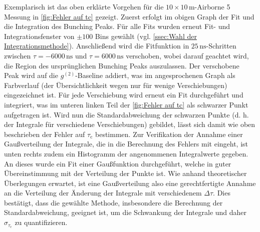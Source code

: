 Exemplarisch ist das oben erklärte Vorgehen für die $10\times 10\,\mathrm{m}$-Airborne 5 Messung in \autoref{fig:Fehler auf tc} gezeigt. 
Zuerst erfolgt im obigen Graph der Fit und die Integration des Bunching Peaks. 
Für alle Fits wurden erneut Fit- und Integrationsfenster von $\pm 100$ Bins gewählt (vgl. \autoref{ssec:Wahl der Integrationsmethode}). 
Anschließend wird die Fitfunktion in $25\,\mathrm{ns}$-Schritten zwischen $\tau = -6000\,\mathrm{ns}$ und $\tau = 6000\,\mathrm{ns}$ verschoben, wobei darauf geachtet wird, die Region des ursprünglichen Bunching Peaks auszulassen. 
Der verschobene Peak wird auf die $g^{(2)}$-Baseline addiert, was im angesprochenen Graph als Farbverlauf (der Übersichtlichkeit wegen nur für wenige Verschiebungen) eingezeichnet ist. 
Für jede Verschiebung wird erneut ein Fit durchgeführt und integriert, was im unteren linken Teil der \autoref{fig:Fehler auf tc} als schwarzer Punkt aufgetragen ist. 
Wird nun die Standardabweichung der schwarzen Punkte (d. h. der Integrale für verschiedene Verschiebungen) gebildet, lässt sich damit wie oben beschrieben der Fehler auf $\tau_{\mathrm{c}}$ bestimmen. 
Zur Verifikation der Annahme einer Gaußverteilung der Integrale, die in die Berechnung des Fehlers mit eingeht, ist unten rechts zudem ein Histogramm der angenommenen Integralwerte gegeben. 
An dieses wurde ein Fit einer Gaußfunktion durchgeführt, welche in guter Übereinstimmung mit der Verteilung der Punkte ist. 
Wie anhand theoretischer Überlegungen erwartet, ist eine Gaußverteilung also eine gerechtfertigte Annahme an die Verteilung der Änderung der Integrale mit verschiedenem $\Delta\tau$. 
Dies bestätigt, dass die gewählte Methode, insbesondere die Berechnung der Standardabweichung, geeignet ist, um die Schwankung der Integrale und daher $\sigma_{\tau_{\mathrm{c}}}$ zu quantifizieren. 
